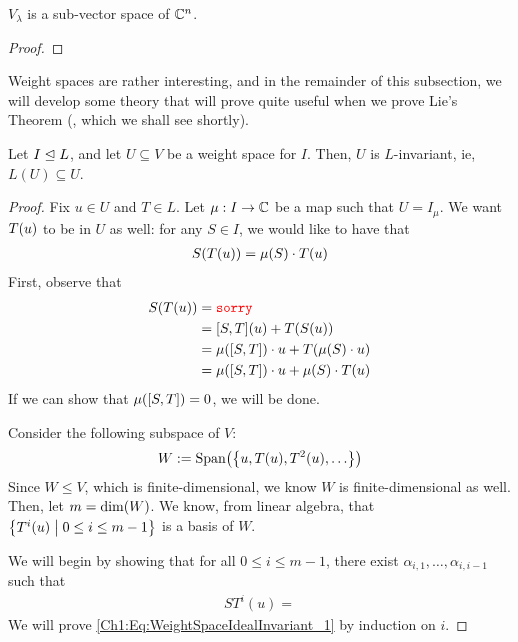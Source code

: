 \begin{lemma}
    $V_\lambda$ is a sub-vector space of $\mathbb{C}^n$.
\end{lemma}
\begin{proof}
    \sorry
\end{proof}

Weight spaces are rather interesting, and in the remainder of this subsection, we will develop some theory that will prove quite useful when we prove Lie's Theorem (, which we shall see shortly).

\begin{boxlemma}\label{Ch1:Lemma:WeightSpaceIdealInvariant}
    Let $I \trianglelefteq L$, and let $U \subseteq V$ be a weight space for $I$. Then, $U$ is $L$-invariant, ie, $L(U) \subseteq U$.
\end{boxlemma}
\begin{proof}
    Fix $u \in U$ and $T \in L$. Let $\mu : I \to \mathbb{C}$ be a map such that $U = I_{\mu}$. We want $T\!\left( u \right)$ to be in $U$ as well: for any $S \in I$, we would like to have that
    \begin{align*}
        S\!\left( T\!\left( u \right) \right) = \mu\!\left( S \right) \cdot T\!\left( u \right)
    \end{align*}
    First, observe that
    \begin{align*}
        \Sof{\Tof{u}}
        &= \text{\sorry} \\
        &= \brac{S, T}\!(u) + \Tof{\Sof{u}} \\
        &= \muof{\brac{S, T}} \cdot u + \Tof{\muof{S} \cdot u} \\
        &= \muof{\brac{S, T}} \cdot u + \muof{S} \cdot \Tof{u}
    \end{align*}
    If we can show that $\mu\!\left( \left[ S, T \right] \right) = 0$, we will be done.

    Consider the following subspace of $V$:
    \begin{align}
        W := \operatorname{Span}\!\left( \left\{ u, T(u), T^2(u), \ldots \right\} \right)
    \end{align}
    Since $W \leq V$, which is finite-dimensional, we know $W$ is finite-dimensional as well. Then, let $m = \dim\!\left( W \right)$. We know, from linear algebra, that $\left\{ T^i(u) \; \middle\vert \; 0 \leq i \leq m - 1 \right\}$ is a basis of $W$.
    
    We will begin by showing that for all $0 \leq i \leq m - 1$, there exist $\alpha_{i, 1}, \ldots, \alpha_{i, i - 1}$ such that
    \begin{align}
        ST^i(u) = 
        \label{Ch1:Eq:WeightSpaceIdealInvariant_1}
    \end{align}
    We will prove \eqref{Ch1:Eq:WeightSpaceIdealInvariant_1} by induction on $i$.


\end{proof}

